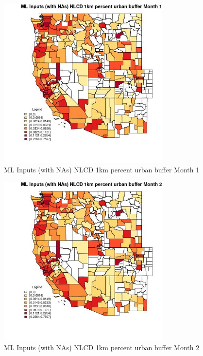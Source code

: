 \begin{figure} 
\centering  
\includegraphics[width=0.77\textwidth]{Code_Outputs/Report_ML_input_PM25_Step4_part_e_de_duplicated_aves_compiled_2019-05-21wNAs_CountyNLCD_1km_percent_urban_buffermedianMonth1.jpg} 
\caption{\label{fig:Report_ML_input_PM25_Step4_part_e_de_duplicated_aves_compiled_2019-05-21wNAsCountyNLCD_1km_percent_urban_buffermedianMonth1}ML Inputs (with NAs) NLCD 1km percent urban buffer Month 1} 
\end{figure} 
 

\begin{figure} 
\centering  
\includegraphics[width=0.77\textwidth]{Code_Outputs/Report_ML_input_PM25_Step4_part_e_de_duplicated_aves_compiled_2019-05-21wNAs_CountyNLCD_1km_percent_urban_buffermedianMonth2.jpg} 
\caption{\label{fig:Report_ML_input_PM25_Step4_part_e_de_duplicated_aves_compiled_2019-05-21wNAsCountyNLCD_1km_percent_urban_buffermedianMonth2}ML Inputs (with NAs) NLCD 1km percent urban buffer Month 2} 
\end{figure} 
 

